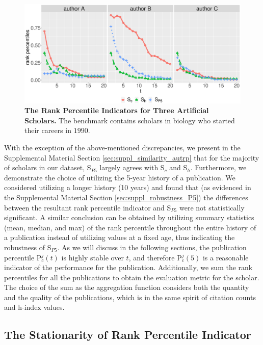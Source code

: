 \begin{figure}[!ht]
    \centering
    \includegraphics[width=\textwidth]{figures/compare_autrp/simulated_authors.eps}
    \caption{{\bf The Rank Percentile Indicators for Three Artificial Scholars.} The benchmark contains scholars in biology who started their careers in $1990$.}
    \label{fig:simulated_authors}
\end{figure}

With the exception of the above-mentioned discrepancies, we present in the Supplemental Material Section \ref{sec:suppl_similarity_autrp} that for the majority of scholars in our dataset, S$_{P5}$ largely agrees with S$_c$ and S$_h$. Furthermore, we demonstrate the choice of utilizing the 5-year history of a publication. We considered utilizing a longer history (10 years) and found that (as evidenced in the Supplemental Material Section \ref{sec:suppl_robustness_P5}) the differences between the resultant rank percentile indicator and S$_{P5}$ were not statistically significant. A similar conclusion can be obtained by utilizing summary statistics (mean, median, and max) of the rank percentile throughout the entire history of a publication instead of utilizing values at a fixed age, thus indicating the robustness of S$_{P5}$. As we will discuss in the following sections, the publication percentile P$_c^{j}(t)$ is highly stable over $t$, and therefore P$_c^{j}(5)$ is a reasonable indicator of the performance for the publication. Additionally, we sum the rank percentiles for all the publications to obtain the evaluation metric for the scholar. The choice of the sum as the aggregation function considers both the quantity and the quality of the publications, which is in the same spirit of citation counts and h-index values.

\subsection*{The Stationarity of Rank Percentile Indicator}

